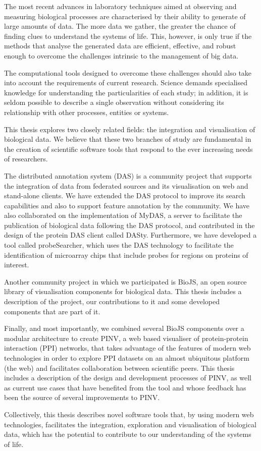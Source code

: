 
The most recent advances in laboratory techniques aimed at observing and measuring biological processes are characterised by their ability to generate of large amounts of data. The more data we gather, the greater the chance of finding clues to understand the systems of life. This, however, is only true if the methods that analyse the generated data are efficient, effective, and robust enough to overcome the challenges intrinsic to the management of big data.

The computational tools designed to overcome these challenges should also take into account the requirements of current research. Science demands specialised knowledge for understanding the particularities of each study; in addition, it is seldom possible to describe a single observation without considering its relationship with other processes, entities or systems.

This thesis explores two closely related fields: the integration and visualisation of biological data. We believe that these two branches of study are fundamental in the creation of scientific software tools that respond to the ever increasing needs of researchers.

The distributed annotation system (DAS) is a community project that supports the integration of data from federated sources and its visualisation on web and stand-alone clients. We have extended the DAS protocol to improve its search capabilities and also to support feature annotation by the community. We have also collaborated on the implementation of MyDAS, a server to facilitate the publication of biological data following the DAS protocol, and contributed in the design of the protein DAS client called DASty. Furthermore, we have developed a tool called probeSearcher, which uses the DAS technology to facilitate the identification of microarray chips that include probes for regions on proteins of interest.

Another community project in which we participated is BioJS, an open source library of visualisation components for biological data. This thesis includes a description of the project, our contributions to it and some developed components that are part of it.

Finally, and most importantly, we combined several BioJS components over a modular architecture to create PINV, a web based visualiser of protein-protein interaction (PPI) networks, that takes advantage of the features of modern web technologies in order to explore PPI datasets on an almost ubiquitous platform (the web) and facilitates collaboration between scientific peers. This thesis includes a description of the design and development processes of PINV, as well as current use cases that have benefited from the tool and whose feedback has been the source of several improvements to PINV.

Collectively, this thesis describes novel software tools that, by using modern web technologies, facilitates the integration, exploration and visualisation of biological data, which has the potential to contribute to our understanding of the systems of life.
